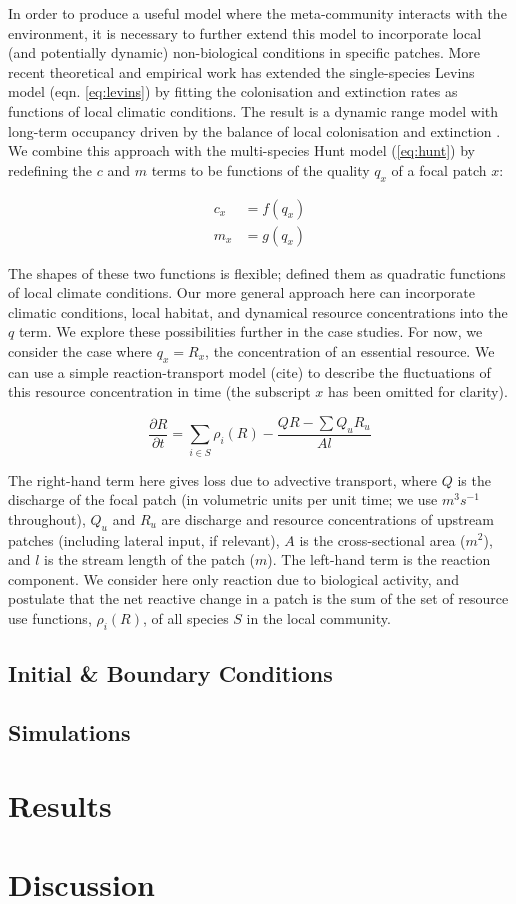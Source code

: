 \documentclass[11pt,a4paper]{article}
\begin{document}
In order to produce a useful model where the meta-community interacts with the environment, it is necessary to further extend this model to incorporate local (and potentially dynamic) non-biological conditions in specific patches.
More recent theoretical \autocite{Holt2000,Holt2005} and empirical \autocite{Talluto2017} work has extended the single-species Levins model (eqn. \ref{eq:levins}) by fitting the colonisation and extinction rates as functions of local climatic conditions.
The result is a dynamic range model with long-term occupancy driven by the balance of local colonisation and extinction \autocite{Talluto2017}.
We combine this approach with the multi-species Hunt model (\ref{eq:hunt}) by redefining the $c$ and $m$ terms to be functions of the quality $q_x$ of a focal patch $x$:

\begin{align}
	c_{x} &= f(q_{x}) \label{eq:talluto} \\
	m_{x} &= g(q_{x})
\end{align}

The shapes of these two functions is flexible; \textcite{Talluto2017} defined them as quadratic functions of local climate conditions.
Our more general approach here can incorporate climatic conditions, local habitat, and dynamical resource concentrations into the $q$ term.
We explore these possibilities further in the case studies.
For now, we consider the case where $q_x = R_x$, the concentration of an essential resource.
We can use a simple reaction-transport model (cite) to describe the fluctuations of this resource concentration in time (the subscript $x$ has been omitted for clarity).

\begin{equation}
	\frac{\partial R}{\partial t} = \sum_{i \in S}{\rho_i(R)} -\frac{QR - \sum Q_u R_u}{A l} 
	\label{eq:rxn_transport}
\end{equation}

The right-hand term here gives loss due to advective transport, where $Q$ is the discharge of the focal patch (in volumetric units per unit time; we use $m^3 s^{-1}$ throughout), $Q_u$ and $R_u$ are discharge and resource concentrations of upstream patches (including lateral input, if relevant), $A$ is the cross-sectional area ($m^2$), and $l$ is the stream length of the patch ($m$).
The left-hand term is the reaction component.
We consider here only reaction due to biological activity, and postulate that the net reactive change in a patch is the sum of the set of resource use functions, $\rho_i(R)$, of all species $S$ in the local community. 

\subsection*{Initial \& Boundary Conditions}

\subsection*{Simulations}

\section*{Results}

\section*{Discussion}

\printbibliography
\end{document}
